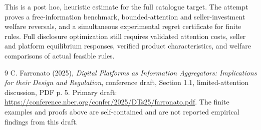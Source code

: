\documentclass[11pt,a4paper]{article}
\begin{document}
This is a post hoc, heuristic estimate for the full catalogue target.
The attempt proves a free-information benchmark, bounded-attention and seller-investment welfare reversals, and a simultaneous experimental regret certificate for finite rules. Full disclosure optimization still requires validated attention costs, seller and platform equilibrium responses, verified product characteristics, and welfare comparisons of actual feasible rules.

\begin{thebibliography}{9}
 C. Farronato (2025), \emph{Digital Platforms as Information Aggregators: Implications for their Design and Regulation}, conference draft, Section 1.1, limited-attention discussion, PDF p. 5. Primary draft: \url{https://conference.nber.org/confer/2025/DTs25/farronato.pdf}. The finite examples and proofs above are self-contained and are not reported empirical findings from this draft.
\end{thebibliography}
\end{document}
